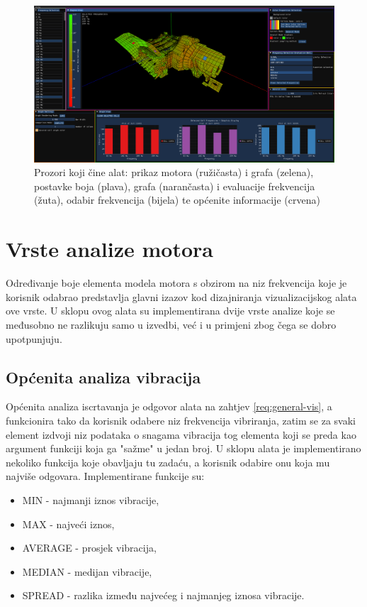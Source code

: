 \documentclass[times, utf8, diplomski]{fer}
\begin{document}
\begin{figure}[H]
\centering
\includegraphics[width=\linewidth]{general_screenshot_segmented.png}
\caption{Prozori koji čine alat: prikaz motora (ružičasta) i grafa (zelena), postavke boja (plava), grafa (narančasta) i evaluacije frekvencija (žuta), odabir frekvencija (bijela) te općenite informacije (crvena)}
\label{fig:gen-screen}
\end{figure}

\section{Vrste analize motora} \label{work-mode-section}

Određivanje boje elementa modela motora s obzirom na niz frekvencija koje je korisnik odabrao predstavlja glavni izazov kod dizajniranja vizualizacijskog alata ove vrste. U sklopu ovog alata su implementirana dvije vrste analize koje se međusobno ne razlikuju samo u izvedbi, već i u primjeni zbog čega se dobro upotpunjuju.

\subsection{Općenita analiza vibracija} \label{normal-mode-section}

Općenita analiza iscrtavanja je odgovor alata na zahtjev \ref{req:general-vis}, a funkcionira tako da korisnik odabere niz frekvencija vibriranja, zatim se za svaki element izdvoji niz podataka o snagama vibracija tog elementa koji se preda kao argument funkciji koja ga "sažme" u jedan broj. U sklopu alata je implementirano nekoliko funkcija koje obavljaju tu zadaću, a korisnik odabire onu koja mu najviše odgovara. Implementirane funkcije su:

\begin{itemize}
\item MIN - najmanji iznos vibracije,
\item MAX - najveći iznos,
\item AVERAGE - prosjek vibracija,
\item MEDIAN - medijan vibracije,
\item SPREAD - razlika između najvećeg i najmanjeg iznosa vibracije.\\
\end{itemize}
\end{document}
